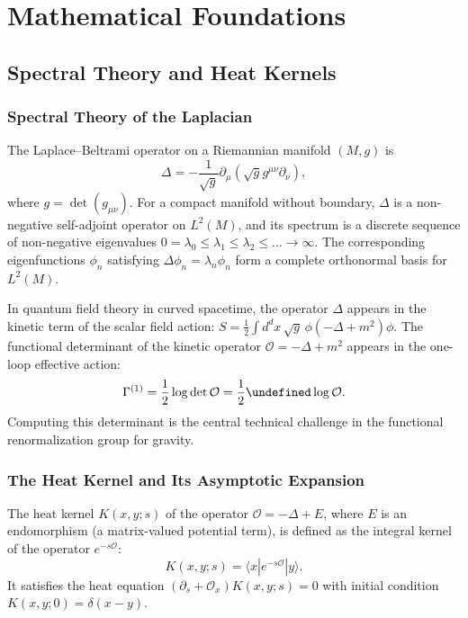 \documentclass[11pt, twoside, openright]{book}
\theoremstyle{dotted}
\theoremstyle{definition}
\let\tr\undefined
\DeclareMathOperator{\tr}{Tr}          %
\begin{document}
\part{Mathematical Foundations}

\chapter{Spectral Theory and Heat Kernels}
\label{ch:spectral_heat}

\section{Spectral Theory of the Laplacian}

The Laplace--Beltrami operator on a Riemannian manifold $(M, g)$ is
\begin{equation}
  \Delta = -\frac{1}{\sqrt{g}}\partial_\mu(\sqrt{g}g^{\mu\nu}\partial_\nu),
  \label{eq:laplace_beltrami}
\end{equation}
where $g = \det(g_{\mu\nu})$. For a compact manifold without boundary, $\Delta$
is a non-negative self-adjoint operator on $L^2(M)$, and its spectrum is a discrete
sequence of non-negative eigenvalues $0 = \lambda_0 \leq \lambda_1 \leq \lambda_2
\leq \ldots \to \infty$. The corresponding eigenfunctions $\phi_n$ satisfying
$\Delta\phi_n = \lambda_n\phi_n$ form a complete orthonormal basis for $L^2(M)$.

In quantum field theory in curved spacetime, the operator $\Delta$ appears in
the kinetic term of the scalar field action: $S = \frac{1}{2}\int d^dx\,\sqrt{g}\,
\phi(-\Delta + m^2)\phi$. The functional determinant of the kinetic operator
$\mathcal{O} = -\Delta + m^2$ appears in the one-loop effective action:
\begin{equation}
  \Gamma^{(1)} = \frac{1}{2}\log\det\mathcal{O} = \frac{1}{2}\tr\log\mathcal{O}.
  \label{eq:one_loop_det}
\end{equation}
Computing this determinant is the central technical challenge in the functional
renormalization group for gravity.

\section{The Heat Kernel and Its Asymptotic Expansion}

The heat kernel $K(x, y; s)$ of the operator $\mathcal{O} = -\Delta + E$, where
$E$ is an endomorphism (a matrix-valued potential term), is defined as the integral
kernel of the operator $e^{-s\mathcal{O}}$:
\begin{equation}
  K(x, y; s) = \langle x|e^{-s\mathcal{O}}|y\rangle.
  \label{eq:heat_kernel_def}
\end{equation}
It satisfies the heat equation $(\partial_s + \mathcal{O}_x)K(x,y;s) = 0$ with
initial condition $K(x,y;0) = \delta(x-y)$.
\end{document}
